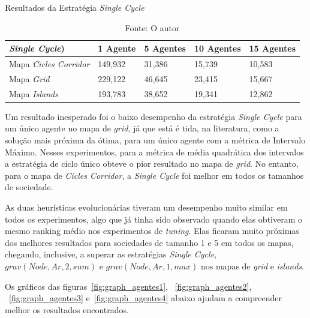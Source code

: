\begin{table}
	\centering
	\caption{Resultados da Estratégia \textit{Single Cycle}}
	\label{result_sc}
	\begin{tabularx}{\linewidth}{|X|X|X|X|X|}
		\hline
		\textbf{\textit{Single Cycle})} & \textbf{1 Agente} & \textbf{5 Agentes} & \textbf{10 Agentes} & \textbf{15 Agentes} \\
		\hline
		Mapa \textit{Cicles Corridor} & 149,932 & 31,386 & 15,739 & 10,583 \\
		\hline
		Mapa \textit{Grid} & 229,122 & 46,645 & 23,415 & 15,667 \\
		\hline
		Mapa \textit{Islands} & 193,783 & 38,652 & 19,341 & 12,862 \\
		\hline
	\end{tabularx}
	\caption*{Fonte: O autor}
\end{table}

Um resultado inesperado foi o baixo desempenho da estratégia \textit{Single Cycle} para um 
único agente no mapa de \textit{grid}, já que está é tida, na literatura, como 
a solução mais próxima da ótima, para um único agente com a métrica de Intervalo 
Máximo. Nesses experimentos, para a métrica de média quadrática dos intervalos a 
estratégia de ciclo único obteve o pior resultado no mapa de \textit{grid}. No 
entanto, para o mapa de \textit{Cicles Corridor}, a \textit{Single Cycle} foi 
melhor em todos os tamanhos de sociedade.

As duas heurísticas evolucionárias tiveram um desempenho muito similar em 
todos os experimentos, algo que já tinha sido observado quando elas obtiveram 
o mesmo ranking médio nos experimentos de \textit{tuning}. Elas ficaram muito 
próximas dos melhores resultados para sociedades de tamanho 1 e 5 em todos os 
mapas, chegando, inclusive, a superar as estratégias \textit{Single Cycle}, 
$grav(Node,Ar,2,sum)$ e $grav(Node,Ar,1,max)$ nos mapas de \textit{grid} e 
\textit{islands}.

Os gráficos das figuras~\ref{fig:graph_agentes1}, ~\ref{fig:graph_agentes2}, 
~\ref{fig:graph_agentes3} e~\ref{fig:graph_agentes4} abaixo ajudam a 
compreender melhor os resultados encontrados.

